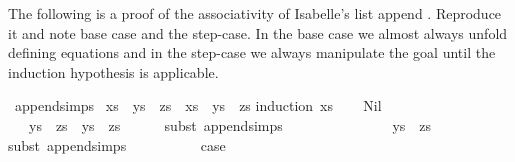 \begin{isabellebody}
\begin{isamarkuptext}
The following is a proof of the associativity of Isabelle's list append \isa{{\isacharat}{\kern0pt}}. Reproduce it and note
base case and the step-case. In the base case we almost always unfold defining equations and in the
step-case we always manipulate the goal until the induction hypothesis is applicable.%
\end{isamarkuptext}\isamarkuptrue%
\isamarkupfalse%
\ append{\isachardot}{\kern0pt}simps\isanewline
\isanewline
{}\isamarkupfalse%
\ {\isachardoublequoteopen}{\isacharparenleft}{\kern0pt}xs\ {\isacharat}{\kern0pt}\ ys{\isacharparenright}{\kern0pt}\ {\isacharat}{\kern0pt}\ zs\ {\isacharequal}{\kern0pt}\ {\isacharparenleft}{\kern0pt}xs\ {\isacharat}{\kern0pt}\ {\isacharparenleft}{\kern0pt}ys\ {\isacharat}{\kern0pt}\ zs{\isacharparenright}{\kern0pt}{\isacharparenright}{\kern0pt}{\isachardoublequoteclose}\isanewline
%
\isadelimproof
%
\endisadelimproof
%
\isatagproof
{}\isamarkupfalse%
{\isacharparenleft}{\kern0pt}induction\ xs{\isacharparenright}{\kern0pt}\isanewline
\ \ \isamarkupfalse%
\ Nil\isanewline
\ \ \isamarkupfalse%
\ {\isachardoublequoteopen}{\isacharparenleft}{\kern0pt}{\isacharbrackleft}{\kern0pt}{\isacharbrackright}{\kern0pt}\ {\isacharat}{\kern0pt}\ ys{\isacharparenright}{\kern0pt}\ {\isacharat}{\kern0pt}\ zs\ {\isacharequal}{\kern0pt}\ ys\ {\isacharat}{\kern0pt}\ zs{\isachardoublequoteclose}\isanewline
\ \ \ \ \isamarkupfalse%
\ {\isacharparenleft}{\kern0pt}subst\ append{\isachardot}{\kern0pt}simps{\isacharparenright}{\kern0pt}\isanewline
\ \ \ \ \isacommand{{\isachardot}{\kern0pt}{\isachardot}{\kern0pt}}\isamarkupfalse%
\isanewline
\ \ \isamarkupfalse%
\ \isamarkupfalse%
\ {\isachardoublequoteopen}{\isachardot}{\kern0pt}{\isachardot}{\kern0pt}{\isachardot}{\kern0pt}\ {\isacharequal}{\kern0pt}\ {\isacharparenleft}{\kern0pt}{\isacharbrackleft}{\kern0pt}{\isacharbrackright}{\kern0pt}\ {\isacharat}{\kern0pt}\ {\isacharparenleft}{\kern0pt}\ ys\ {\isacharat}{\kern0pt}\ zs{\isacharparenright}{\kern0pt}{\isacharparenright}{\kern0pt}{\isachardoublequoteclose}\isanewline
\ \ \ \ \isamarkupfalse%
{\isacharparenleft}{\kern0pt}subst\ append{\isachardot}{\kern0pt}simps{\isacharparenright}{\kern0pt}\isanewline
\ \ \ \ \isacommand{{\isachardot}{\kern0pt}{\isachardot}{\kern0pt}}\isamarkupfalse%
\isanewline
\ \ \isamarkupfalse%
\ \isamarkupfalse%
\ {\isacharquery}{\kern0pt}case\isanewline
\ \ \ \ \isacommand{{\isachardot}{\kern0pt}}\isamarkupfalse%

\end{isabellebody}
